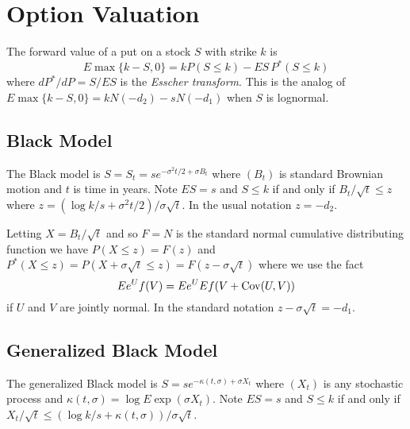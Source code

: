 \documentclass[11pt]{article}
\newcommand{\Cov}{\mathop{\rm{Cov}}}
\theoremstyle{remark}
\begin{document}
%

%

\section{Option Valuation}
The forward value of a put on a stock \(S\) with strike \(k\) is
\[
E\max\{k - S,0\} = k P(S \le k) - E S\,P^*(S \le k)
\]
where \(dP^*/dP = S/ES\) is the {\em Esscher transform}\cite{?}.
This is the analog of 
\(E\max\{k - S,0\} = kN(-d_2) - sN(-d_1)\)
when \(S\) is lognormal.

\subsection{Black Model}
The Black model is \(S = S_t = se^{-\sigma^2t/2 + \sigma B_t}\)
where \((B_t)\) is standard Brownian motion and \(t\) is time
in years. Note \(ES = s\) and \(S \le k\)
if and only if \(B_t/\sqrt{t} \le z\) where
\(z = (\log k/s + \sigma^2 t/2)/\sigma\sqrt{t}\). In the usual
notation \(z = -d_2\).

Letting \(X = B_t/\sqrt{t}\) and so \(F = N\) is the standard
normal cumulative distributing function we have
\(P(X\le z) = F(z)\) and \(P^*(X\le z) = P(X + \sigma\sqrt{t} \le z)
= F(z - \sigma\sqrt{t})\) where we use the fact
\[
Ee^U f(V) = Ee^U Ef(V + \Cov(U,V))
\]
if \(U\) and \(V\) are
jointly normal. In the standard notation \(z - \sigma\sqrt{t} = -d_1\).

\subsection{Generalized Black Model}
The generalized Black model is \(S = se^{-\kappa(t,\sigma) + \sigma X_t}\)
where \((X_t)\) is any stochastic process and 
\(\kappa(t, \sigma) = \log E \exp(\sigma X_t)\). 
Note \(ES = s\) and \(S \le k\)
if and only if 
\(X_t/\sqrt{t} \le (\log k/s + \kappa(t,\sigma))/\sigma\sqrt{t}\).
\end{document}
